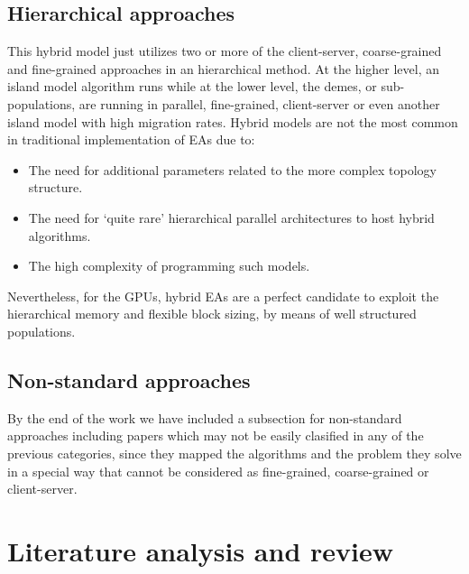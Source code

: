 \documentclass{article}
\begin{document}
\subsection{Hierarchical approaches}
\label{subsec:hierarchicalapproaches}

This hybrid model just utilizes two or more of the client-server, coarse-grained and fine-grained approaches in an hierarchical method. At the higher level, an island model algorithm runs while at the lower level, the demes, or sub-populations, are running in parallel, fine-grained, client-server or even another island model with high migration rates. Hybrid models are not the most common in traditional implementation of EAs due to:
\begin{itemize}
 \item The need for additional parameters related to the more complex topology structure.
 \item The need for `quite rare' hierarchical parallel architectures to host hybrid algorithms.
\item The high complexity of programming such models.
\end{itemize}

Nevertheless, for the GPUs, hybrid EAs are a perfect candidate to exploit the hierarchical memory and flexible block sizing, by means of well structured populations.


\subsection{Non-standard approaches}
\label{subsec:nonstandardapproaches}

By the end of the work we have included a subsection for non-standard
approaches \cite{DBLP:conf/gecco/PospichalMOSJ11} including papers
which may not be easily clasified in any of the previous categories, since they
mapped the algorithms and the problem they solve in a special way that
cannot be considered as fine-grained, coarse-grained or client-server.


\section{Literature analysis and review}
\label{sec:survey}
\end{document}

